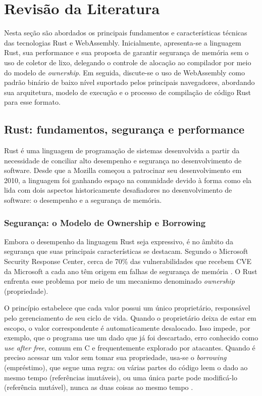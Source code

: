 \chapter{Revisão da Literatura}

Nesta seção são abordados os principais fundamentos e características técnicas das tecnologias Rust e WebAssembly. Inicialmente, apresenta-se a linguagem Rust, sua performance e sua proposta de garantir segurança de memória sem o uso de coletor de lixo, delegando o controle de alocação ao compilador por meio do modelo de \emph{ownership}. Em seguida, discute-se o uso de WebAssembly como padrão binário de baixo nível suportado pelos principais navegadores, abordando sua arquitetura, modelo de execução e o processo de compilação de código Rust para esse formato.

\section{Rust: fundamentos, segurança e performance}

Rust é uma linguagem de programação de sistemas desenvolvida a partir da necessidade de conciliar alto desempenho e segurança no desenvolvimento de software. Desde que a Mozilla começou a patrocinar seu desenvolvimento em 2010, a linguagem foi ganhando espaço na comunidade devido à forma como ela lida com dois aspectos historicamente desafiadores no desenvolvimento de software: o desempenho e a segurança de memória.

\subsection{Segurança: o Modelo de Ownership e Borrowing}

Embora o desempenho da linguagem Rust seja expressivo, é no âmbito da segurança que suas principais características se destacam. Segundo o Microsoft Security Response Center, cerca de 70\% das vulnerabilidades que recebem CVE da Microsoft a cada ano têm origem em falhas de segurança de memória \cite{thomas2019}. O Rust enfrenta esse problema por meio de um mecanismo denominado \emph{ownership} (propriedade).

O princípio estabelece que cada valor possui um único proprietário, responsável pelo gerenciamento de seu ciclo de vida. Quando o proprietário deixa de estar em escopo, o valor correspondente é automaticamente desalocado. Isso impede, por exemplo, que o programa use um dado que já foi descartado, erro conhecido como \emph{use after free}, comum em C e frequentemente explorado por atacantes. Quando é preciso acessar um valor sem tomar sua propriedade, usa-se o \emph{borrowing} (empréstimo), que segue uma regra: ou várias partes do código leem o dado ao mesmo tempo (referências imutáveis), ou uma única parte pode modificá-lo (referência mutável), nunca as duas coisas ao mesmo tempo \cite{bugden2022}.

